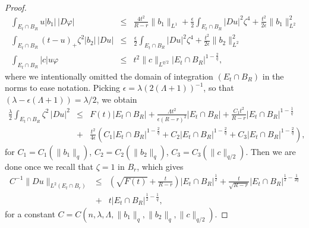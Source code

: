 \documentclass[12pt,a4paper]{amsart}
\numberwithin{equation}{section} %
\theoremstyle{definition}
\theoremstyle{remark}
\begin{document}
\begin{proof}
\begin{eqnarray*}
    \int_{E_t \cap B_R}u |b_1|\, |D\varphi| & \leq & \frac{4t^2}{R-r}\|b_1\|_{L^1} + \frac{\epsilon}{2}
    \int_{E_t \cap B_R}|Du|^2 \zeta^4 + \frac{t^2}{2\epsilon}\|b_1\|_{L^2}^2\\
    \int_{E_t \cap B_R}(t-u)_+\zeta^2|b_2|\,|Du|& \leq & \frac{\epsilon}{2} \int_{E_t \cap B_R}|Du|^2\zeta^4 + \frac{t^2}{2\epsilon}\|b_2\|_{L^2}^2\\
    \int_{E_t \cap B_R}|c|u \varphi & \leq & t^2\|c\|_{L^{q/2}}|E_t \cap B_R|^{1 - \frac{2}{q}},
\end{eqnarray*}
where we intentionally omitted the domain of integration $(E_t \cap B_R)$ in the norms  to ease notation. Picking $\epsilon = \lambda(2(\Lambda+1))^{-1}$, so that $\left(\lambda-\epsilon(\Lambda+1)\right) = \lambda/2$, we obtain
\begin{eqnarray*}
    \frac{\lambda}{2} \int_{E_t\cap B_R} \zeta^2\, |Du|^2  & \leq & F(t)|E_t \cap B_R| + \frac{\Lambda t^2}{\epsilon(R-r)^2}|E_t \cap B_R| + \frac{C_1t^2}{R-r}|E_t \cap B_R|^{1 - \frac{1}{q}}\\
    & + & \frac{t^2}{4\epsilon}\left(C_1|E_t \cap B_R|^{1 - \frac{2}{q}} + C_2 |E_t \cap B_R|^{1 - \frac{2}{q}} + C_3|E_t \cap B_R|^{1 - \frac{2}{q}}\right),
\end{eqnarray*}
for $C_1 = C_1(\|b_1\|_{q})$, $C_2 = C_2(\|b_2\|_{q})$, $C_3 = C_3(\|c\|_{q/2})$. Then we are done once we recall that $\zeta = 1$ in $B_r$, which gives
\begin{eqnarray*}
    C^{-1}\|Du\|_{L^2(E_t \cap B_r)} & \leq & \left(\sqrt{F(t)} + \frac{t}{R-r} \right)|E_t \cap B_R|^{\frac{1}{2}} + \frac{t}{\sqrt{R-r}}|E_t \cap B_R|^{\frac{1}{2}-\frac{1}{2q}}\\
    & + &  t|E_t \cap B_R|^{\frac{1}{2}-\frac{1}{q}},
\end{eqnarray*}
for a constant $C = C(n,\lambda,\Lambda,\|b_1\|_{q},\|b_2\|_{q},\|c\|_{q/2})$. 
\medskip


\end{proof}
\end{document}
